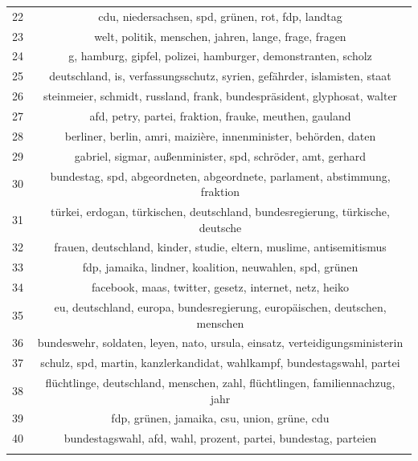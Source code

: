 \documentclass[
]{article}
\begin{document}
\begin{table}[!htbp]
\begin{tabular}{@{\extracolsep{5pt}} cc}
22 & cdu, niedersachsen, spd, grünen, rot, fdp, landtag \\ 
23 & welt, politik, menschen, jahren, lange, frage, fragen \\ 
24 & g, hamburg, gipfel, polizei, hamburger, demonstranten, scholz \\ 
25 & deutschland, is, verfassungsschutz, syrien, gefährder, islamisten, staat \\ 
26 & steinmeier, schmidt, russland, frank, bundespräsident, glyphosat, walter \\ 
27 & afd, petry, partei, fraktion, frauke, meuthen, gauland \\ 
28 & berliner, berlin, amri, maizière, innenminister, behörden, daten \\ 
29 & gabriel, sigmar, außenminister, spd, schröder, amt, gerhard \\ 
30 & bundestag, spd, abgeordneten, abgeordnete, parlament, abstimmung, fraktion \\ 
31 & türkei, erdogan, türkischen, deutschland, bundesregierung, türkische, deutsche \\ 
32 & frauen, deutschland, kinder, studie, eltern, muslime, antisemitismus \\ 
33 & fdp, jamaika, lindner, koalition, neuwahlen, spd, grünen \\ 
34 & facebook, maas, twitter, gesetz, internet, netz, heiko \\ 
35 & eu, deutschland, europa, bundesregierung, europäischen, deutschen, menschen \\ 
36 & bundeswehr, soldaten, leyen, nato, ursula, einsatz, verteidigungsministerin \\ 
37 & schulz, spd, martin, kanzlerkandidat, wahlkampf, bundestagswahl, partei \\ 
38 & flüchtlinge, deutschland, menschen, zahl, flüchtlingen, familiennachzug, jahr \\ 
39 & fdp, grünen, jamaika, csu, union, grüne, cdu \\ 
40 & bundestagswahl, afd, wahl, prozent, partei, bundestag, parteien \\ 
\hline \\[-1.8ex] 
\end{tabular} 
\end{table}
\end{document}
